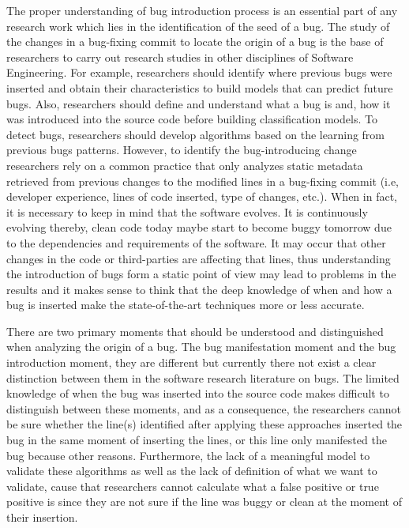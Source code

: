 \documentclass[a4paper, 12pt]{book}
\begin{document}
The proper understanding of bug introduction process is an essential part of any research work which lies in the identification of the seed of a bug. The study of the changes in a bug-fixing commit to locate the origin of a bug is the base of researchers to carry out research studies in other disciplines of Software Engineering. For example, researchers should identify where previous bugs were inserted and obtain their characteristics to build models that can predict future bugs. Also, researchers should define and understand what a bug is and, how it was introduced into the source code before building classification models. To detect bugs, researchers should develop algorithms based on the learning from previous bugs patterns. However, to identify the bug-introducing change researchers rely on a common practice that only analyzes static metadata retrieved from previous changes to the modified lines in a bug-fixing commit (i.e, developer experience, lines of code inserted, type of changes, etc.). When in fact, it is necessary to keep in mind that the software evolves. It is continuously evolving thereby, clean code today maybe start to become buggy tomorrow due to the dependencies and requirements of the software. It may occur that other changes in the code or third-parties are affecting that lines, thus understanding the introduction of bugs form a static point of view may lead to problems in the results and it makes sense to think that the deep knowledge of when and how a bug is inserted make the state-of-the-art techniques more or less accurate. %

There are two primary moments that should be understood and distinguished when analyzing the origin of a bug. The bug manifestation moment and the bug introduction moment, they are different but currently there not exist a clear distinction between them in the software research literature on bugs. The limited knowledge of when the bug was inserted into the source code makes difficult to distinguish between these moments, and as a consequence, the researchers cannot be sure whether the line(s) identified after applying these approaches inserted the bug in the same moment of inserting the lines, or this line only manifested the bug because other reasons. Furthermore, the lack of a meaningful model to validate these algorithms as well as the lack of definition of what we want to validate, cause that researchers cannot calculate what a false positive or true positive is since they are not sure if the line was buggy or clean at the moment of their insertion.
\end{document}
